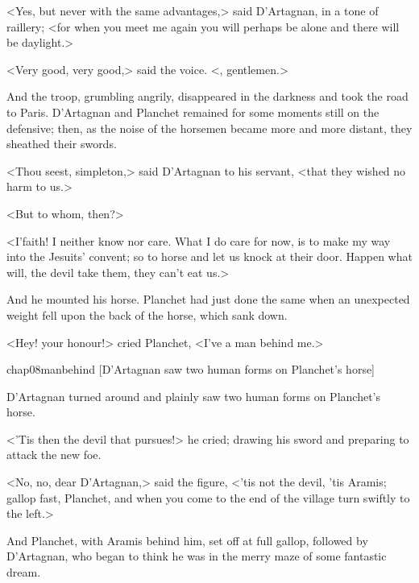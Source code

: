 <Yes, but never with the same advantages,> said D'Artagnan, in a tone of raillery; <for when you meet me again you will perhaps be alone and there will be daylight.>

<Very good, very good,> said the voice. <, gentlemen.>

And the troop, grumbling angrily, disappeared in the darkness and took the road to Paris. D'Artagnan and Planchet remained for some moments still on the defensive; then, as the noise of the horsemen became more and more distant, they sheathed their swords.

<Thou seest, simpleton,> said D'Artagnan to his servant, <that they wished no harm to us.>

<But to whom, then?>

<I'faith! I neither know nor care. What I do care for now, is to make my way into the Jesuits' convent; so to horse and let us knock at their door. Happen what will, the devil take them, they can't eat us.>

And he mounted his horse. Planchet had just done the same when an unexpected weight fell upon the back of the horse, which sank down.

<Hey! your honour!> cried Planchet, <I've a man behind me.>


\begin{bwbigpic}
	[\basicscale] 
	{chap08manbehind}
	[D'Artagnan saw two human forms on Planchet's horse]
\end{bwbigpic}


D'Artagnan turned around and plainly saw two human forms on Planchet's horse.

<'Tis then the devil that pursues!> he cried; drawing his sword and preparing to attack the new foe.

<No, no, dear D'Artagnan,> said the figure, <'tis not the devil, 'tis Aramis; gallop fast, Planchet, and when you come to the end of the village turn swiftly to the left.>

And Planchet, with Aramis behind him, set off at full gallop, followed by D'Artagnan, who began to think he was in the merry maze of some fantastic dream. 